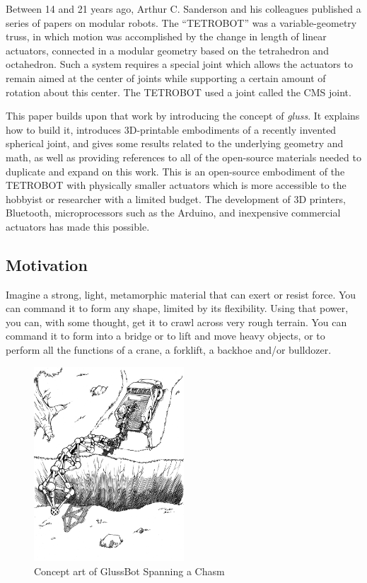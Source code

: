 \documentclass[11pt]{article}
\begin{document}
Between 14 and 21 years ago, Arthur C. Sanderson and his colleagues published a series of
papers\cite{sanderson1996modular,lee2002dynamic,lee1999dynamics} on modular robots.
The ``TETROBOT'' was a variable-geometry truss, in which motion was accomplished by the change
in length of linear actuators, connected in a modular geometry based on the tetrahedron and octahedron.  Such a system
requires a special joint which allows the actuators to remain aimed at the center of joints while supporting
a certain amount of rotation about this center.  The TETROBOT used a joint called the CMS joint.

This paper builds upon that work by introducing the concept of \emph{gluss}. It explains how to build it,
introduces 3D-printable embodiments of
a recently invented spherical joint\cite{song2003spherical}, 
and gives some results related to the underlying geometry and math, as well as providing
references to all of the open-source materials needed to duplicate and expand on this work. This is an
open-source embodiment of the TETROBOT with physically smaller actuators which is more accessible to the
hobbyist or researcher with a limited budget.  The development of 3D printers, Bluetooth, microprocessors
such as the Arduino, and inexpensive commercial actuators has made this possible.

\subsection{Motivation}

Imagine a strong, light, metamorphic material that can exert or resist force.
You can command it to form any shape, limited by its flexibility.
Using that power, you can, with some thought, get it to crawl across very rough terrain.
You can command it to form into a bridge or to lift and move heavy objects,
or to perform all the functions of a crane, a forklift, a backhoe and/or bulldozer.

\begin{figure}[H]
  \centering
    \includegraphics[width=0.5\textwidth]{figures/robotTruckChasm.png}
    \caption[Concept art of GlussBot Spanning a Chasm]{Concept art of GlussBot Spanning a Chasm}
      \label{chasmspan}
\end{figure}
\end{document}
